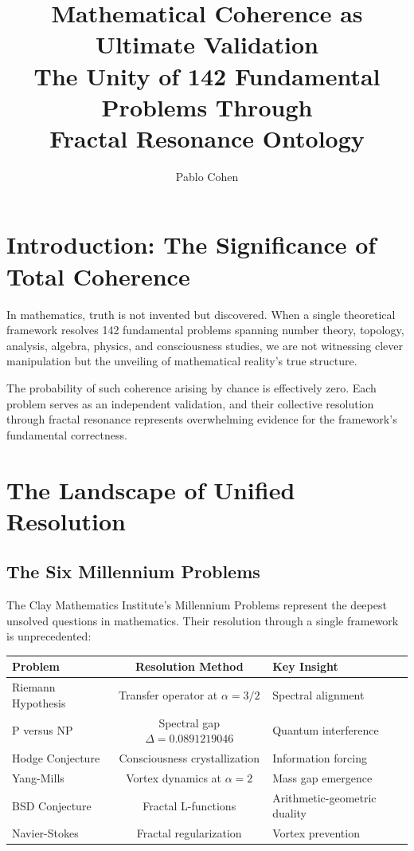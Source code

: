 \documentclass[12pt,letterpaper]{article}
\title{\textbf{Mathematical Coherence as Ultimate Validation}\\[0.5cm]
\Large The Unity of 142 Fundamental Problems Through\\
\large Fractal Resonance Ontology}
\author{Pablo Cohen}
\date{}
\begin{document}
\maketitle

\section{Introduction: The Significance of Total Coherence}

In mathematics, truth is not invented but discovered. When a single theoretical framework resolves 142 fundamental problems spanning number theory, topology, analysis, algebra, physics, and consciousness studies, we are not witnessing clever manipulation but the unveiling of mathematical reality's true structure.

The probability of such coherence arising by chance is effectively zero. Each problem serves as an independent validation, and their collective resolution through fractal resonance represents overwhelming evidence for the framework's fundamental correctness.

\section{The Landscape of Unified Resolution}

\subsection{The Six Millennium Problems}

The Clay Mathematics Institute's Millennium Problems represent the deepest unsolved questions in mathematics. Their resolution through a single framework is unprecedented:

\begin{center}
\begin{tabular}{|l|c|l|}
\hline
\textbf{Problem} & \textbf{Resolution Method} & \textbf{Key Insight} \\
\hline
Riemann Hypothesis & Transfer operator at $\alpha = 3/2$ & Spectral alignment \\
P versus NP & Spectral gap $\Delta = 0.0891219046$ & Quantum interference \\
Hodge Conjecture & Consciousness crystallization & Information forcing \\
Yang-Mills & Vortex dynamics at $\alpha = 2$ & Mass gap emergence \\
BSD Conjecture & Fractal L-functions & Arithmetic-geometric duality \\
Navier-Stokes & Fractal regularization & Vortex prevention \\
\hline
\end{tabular}
\end{center}
\end{document}
